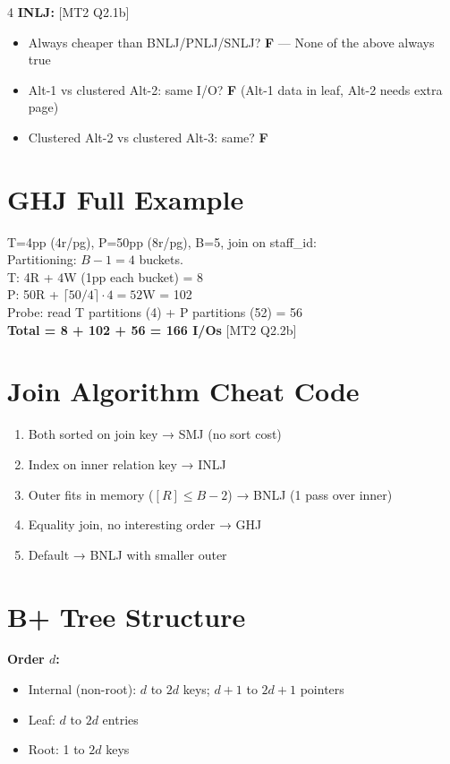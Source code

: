 \documentclass[8pt,letterpaper]{article}
\newcommand{\key}[1]{\textbf{\color{red!70!black}#1}}
\newcommand{\ans}[1]{\textbf{\color{blue!80!black}#1}}
\newcommand{\qref}[1]{{\fontsize{3.5}{4}\selectfont\color{purple!60!black}[#1]}}
\begin{document}
\begin{multicols*}{4}
\key{INLJ:} \qref{MT2 Q2.1b}
\begin{itemize}
  \item Always cheaper than BNLJ/PNLJ/SNLJ? \ans{F} — None of the above always true
  \item Alt-1 vs clustered Alt-2: same I/O? \ans{F} (Alt-1 data in leaf, Alt-2 needs extra page)
  \item Clustered Alt-2 vs clustered Alt-3: same? \ans{F}
\end{itemize}

\section{GHJ Full Example}
\begin{ansbox}
T=4pp (4r/pg), P=50pp (8r/pg), B=5, join on staff\_id:\\
Partitioning: $B-1=4$ buckets.\\
T: 4R + $4$W (1pp each bucket) = 8\\
P: 50R + $\lceil50/4\rceil\cdot4=52$W = 102\\
Probe: read T partitions (4) + P partitions (52) = 56\\
\textbf{Total = 8 + 102 + 56 = 166 I/Os} \qref{MT2 Q2.2b}
\end{ansbox}

\section{Join Algorithm Cheat Code}
\begin{enumerate}
  \item Both sorted on join key → SMJ (no sort cost)
  \item Index on inner relation key → INLJ
  \item Outer fits in memory ($[R]\le B-2$) → BNLJ (1 pass over inner)
  \item Equality join, no interesting order → GHJ
  \item Default → BNLJ with smaller outer
\end{enumerate}

\section{B+ Tree Structure}
\key{Order $d$:}
\begin{itemize}
  \item Internal (non-root): $d$ to $2d$ keys; $d+1$ to $2d+1$ pointers
  \item Leaf: $d$ to $2d$ entries
  \item Root: 1 to $2d$ keys
\end{itemize}


\end{multicols*}
\end{document}
